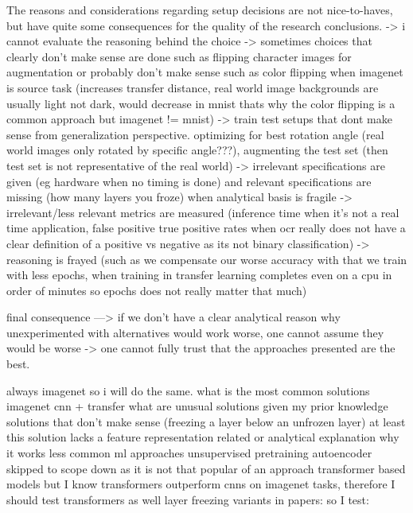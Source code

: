 \documentclass{article}
\begin{document}
The reasons and considerations regarding setup decisions are not nice-to-haves, but have quite some consequences for the quality of the research conclusions.
-> i cannot evaluate the reasoning behind the choice
-> sometimes choices that clearly don't make sense are done such as flipping character images for augmentation or probably don't make sense such as color flipping when imagenet is source task (increases transfer distance, real world image backgrounds are usually light not dark, would decrease in mnist thats why the color flipping is a common approach but imagenet != mnist)
-> train test setups that dont make sense from generalization perspective. optimizing for best rotation angle (real world images only rotated by specific angle???), augmenting the test set (then test set is not representative of the real world)
-> irrelevant specifications are given (eg hardware when no timing is done) and relevant specifications are missing (how many layers you froze) when analytical basis is fragile
-> irrelevant/less relevant metrics are measured (inference time when it's not a real time application, false positive true positive rates when ocr really does not have a clear definition of a positive vs negative as its not binary classification)
-> reasoning is frayed (such as we compensate our worse accuracy with that we train with less epochs, when training in transfer learning completes even on a cpu in order of minutes so epochs does not really matter that much)

final consequence
---> if we don't have a clear analytical reason why unexperimented with alternatives would work worse, one cannot assume they would be worse -> one cannot fully trust that the approaches presented are the best.




always imagenet so i will do the same.
what is the most common solutions
    imagenet cnn + transfer
what are unusual solutions given my prior knowledge
    solutions that don't make sense (freezing a layer below an unfrozen layer)
        at least this solution lacks a feature representation related or analytical explanation why it works
    less common ml approaches
        unsupervised pretraining
            autoencoder skipped to scope down as it is not that popular of an approach
        transformer based models
            but I know transformers outperform cnns on imagenet tasks, therefore I should test transformers as well
layer freezing 
    variants in papers:
    so I test:
\end{document}
